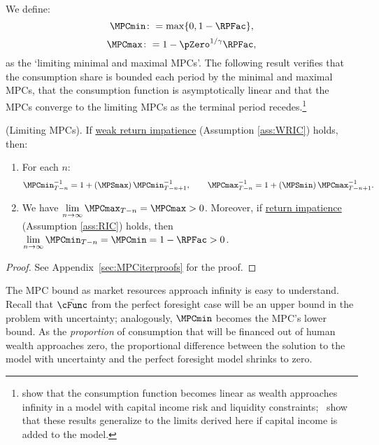 \documentclass[BufferStockTheory]{subfiles}
\begin{document}
We define:
%
\hypertarget{MPCmaxDefn}{}\hypertarget{MPCminDefn}{}
\begin{equation}
\MPCmin \colon = \max\{0,1- \RPFac\}, \label{eq:MPCminDefn}
\end{equation}
\begin{equation}
\MPCmax \colon = 1 - \pZero^{1/\gamma}\RPFac, \label{eq:MPCmaxDefn}
\end{equation}
as the `limiting minimal and maximal MPCs'.
The following result verifies that the consumption share is bounded each period by the minimal and maximal MPCs, that the consumption function is asymptotically linear and that the MPCs converge to the limiting MPCs as the terminal period recedes.\footnote{\cite{benhabibWealth} show that the consumption function becomes linear as wealth approaches infinity in a model with capital income risk and liquidity constraints;~\cite{maTodaRich} show that these results generalize to the limits derived here if capital income is added to the model.} 
\hypertarget{cFuncBounds}{}

\begin{lemma}(Limiting MPCs).
\label{lemm:MPC}
If \hyperlink{WRIC}{weak return impatience} (Assumption \ref{ass:WRIC}) holds, then:

\begin{enumerate}[label=(\roman*)]
\item For each $n$:
%
\begin{equation}\label{eq:MPCminInv}
\MPCmin_{T-n}^{-1}  = 1+\left(\MPSmax\right) \MPCmin_{T-n+1}^{-1}, \qquad \MPCmax_{T-n}^{-1}   = 1+\left(\MPSmin\right) \MPCmax_{T-n+1}^{-1}.
\end{equation}

\item  We have $\lim\limits_{n \rightarrow \infty }\MPCmax_{T-n} = \MPCmax>0$.
Moreover, if \hyperlink{RIC}{return impatience} (Assumption \ref{ass:RIC}) holds, then $\lim\limits_{n \rightarrow  \infty}\MPCmin_{T-n} = \MPCmin = 1- \RPFac>0$.

\end{enumerate}
\end{lemma}
\begin{proof}\let\qed\relax
  See Appendix~\ref{sec:MPCiterproofs} for the proof.

  \end{proof}

The MPC bound as market resources approach infinity is easy to understand.
Recall that $\bar{\cFunc}$ from the perfect foresight case will be an upper bound in the problem with uncertainty; analogously, $\MPCmin$ becomes the MPC's lower bound.
As the \textit{proportion} of consumption that will be financed out of human wealth approaches zero, the proportional difference between the solution to the model with uncertainty and the perfect foresight model shrinks to zero.
\end{document}

